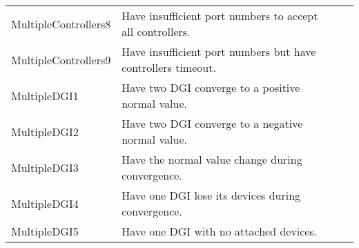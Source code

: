 \documentclass{article}
\begin{document}
\begin{center}
\begin{footnotesize}
\begin{longtable}{|p{3cm}|p{4cm}|p{10cm}|c|}
    MultipleControllers8 & Have insufficient port numbers to accept all controllers. & & \\
    MultipleControllers9 & Have insufficient port numbers but have controllers timeout. & & \\
    MultipleDGI1 & Have two DGI converge to a positive normal value. & & \\
    MultipleDGI2 & Have two DGI converge to a negative normal value. & & \\
    MultipleDGI3 & Have the normal value change during convergence. & & \\
    MultipleDGI4 & Have one DGI lose its devices during convergence. & & \\
    MultipleDGI5 & Have one DGI with no attached devices. & & \\
\end{longtable}
\end{footnotesize}
\end{center}
\end{document}
